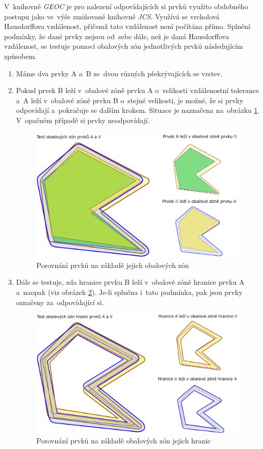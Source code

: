 V~knihovně \textit{GEOC} je pro nalezení odpovídajících si prvků využito 
obdobného postupu jako ve~výše zmiňované knihovně \textit{JCS}. Využívá 
se vrcholová Hausdorffova vzdálenost, přičemž tato vzdálenost není počítána 
přímo. Splnění podmínky, že dané prvky nejsou od~sebe dále, než je daná 
Hausdorffova vzdálenost, se testuje pomocí obalových zón jednotlivých prvků 
následujícím způsobem.

\begin{enumerate}
 \item Máme dva prvky A a~B ze~dvou různých překrývajících se vrstev.
 \item Pokud prvek B leží v~obalové zóně prvku A o~velikosti vzdálenostní 
    tolerance a~A leží v~obalové zóně prvku B o~stejné velikosti, je možné, 
    že si prvky odpovídají a~pokračuje se dalším krokem. Situace je naznačena
    na~obrázku \ref{fig:buffer}. V~opačném případě si prvky neodpovídají.

\label{bfpic}
  \begin{figure}[hbt]
    \centering
      \includegraphics[width=300pt]{./pictures/buffer-test.pdf}
      \caption{Porovnání prvků na základě jejich obalových zón}
      \label{fig:buffer}

  \end{figure}
 \item Dále se testuje, zda hranice prvku B leží v~obalové zóně hranice prvku
    A a~naopak (viz obrázek \ref{fig:buffer-boundary}). Je-li splněna i~tato 
    podmínka, pak jsou prvky označeny za~odpovídající si.

\label{bf2pic}
  \begin{figure}[hbt]
    \centering
      \includegraphics[width=300pt]{./pictures/buffer-boundary.pdf}
      \caption{Porovnání prvků na základě obalových zón jejich hranic}
      \label{fig:buffer-boundary}
  \end{figure}

\end{enumerate}

